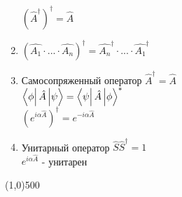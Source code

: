 \begin{enumerate}
      $ (\hat{A}^\dagger)^\dagger = \hat{A} $
\item $ (\hat{A_1} \cdot ... \cdot \hat{A_n})^\dagger = \hat{A_n}^\dagger \cdot ... \cdot \hat{A_1}^\dagger $
\item Самосопряженный оператор $\hat{A}^\dagger = \hat{A} $\\
      $ \matrixel{\phi}{\hat{A}}{\psi} = \matrixel{\psi}{\hat{A}}{\phi}^* $\\
      $ (e^{i\alpha\hat{A}})^\dagger = e^{-i\alpha\hat{A}} $
\item Унитарный оператор $ \hat{S}\hat{S}^\dagger = 1 $\\
      $ e^{i\alpha\hat{A}} $ - унитарен
\end{enumerate}
\line(1,0){500}

